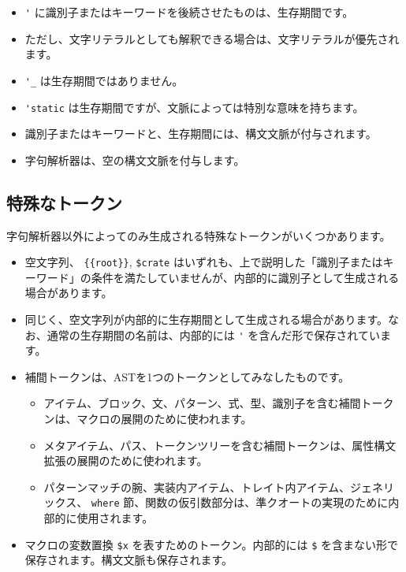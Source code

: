 \documentclass[dvipdfmx,uplatex,papersize,a4paper,10pt]{jsbook}
\theoremstyle{definition}
\begin{document}
\begin{itemize}
  \item \verb|'| に識別子またはキーワードを後続させたものは、生存期間です。
  \item ただし、文字リテラルとしても解釈できる場合は、文字リテラルが優先されます。
  \item \verb|'_| は生存期間ではありません。
  \item \verb|'static| は生存期間ですが、文脈によっては特別な意味を持ちます。
  \item 識別子またはキーワードと、生存期間には、構文文脈が付与されます。
  \item 字句解析器は、空の構文文脈を付与します。
\end{itemize}

\subsection{特殊なトークン}

字句解析器以外によってのみ生成される特殊なトークンがいくつかあります。

\begin{itemize}
  \item 空文字列、 \verb|{{root}}|, \verb|$crate| はいずれも、上で説明した「識別子またはキーワード」の条件を満たしていませんが、内部的に識別子として生成される場合があります。
  \item 同じく、空文字列が内部的に生存期間として生成される場合があります。なお、通常の生存期間の名前は、内部的には \verb|'| を含んだ形で保存されています。
  \item 補間トークンは、ASTを1つのトークンとしてみなしたものです。
    \begin{itemize}
      \item アイテム、ブロック、文、パターン、式、型、識別子を含む補間トークンは、マクロの展開のために使われます。
      \item メタアイテム、パス、トークンツリーを含む補間トークンは、属性構文拡張の展開のために使われます。
      \item パターンマッチの腕、実装内アイテム、トレイト内アイテム、ジェネリックス、 \verb|where| 節、関数の仮引数部分は、準クオートの実現のために内部的に使用されます。
    \end{itemize}
  \item マクロの変数置換 \verb|$x| を表すためのトークン。内部的には \verb|$| を含まない形で保存されます。構文文脈も保存されます。
\end{itemize}
\end{document}
